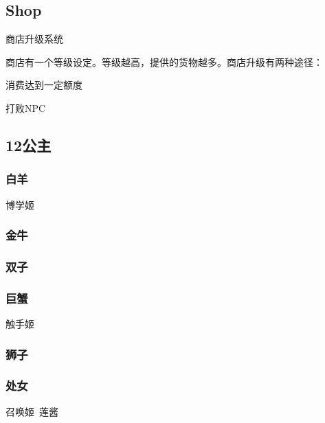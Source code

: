\documentclass{article}
\begin{document}

\subsection{Shop}

商店升级系统

商店有一个等级设定。等级越高，提供的货物越多。商店升级有两种途径：

消费达到一定额度

打败NPC

\subsection{12公主}

\subsubsection{白羊}
\label{costume_majo}

博学姬

\subsubsection{金牛}
\label{costume_maid}



\subsubsection{双子}
\label{costume_idol}



\subsubsection{巨蟹}
\label{costume_mermaid}

触手姬

\subsubsection{狮子}
\label{costume_hime}


\subsubsection{处女}
\label{costume_dress}

召唤姬\ 莲酱
\end{document}
